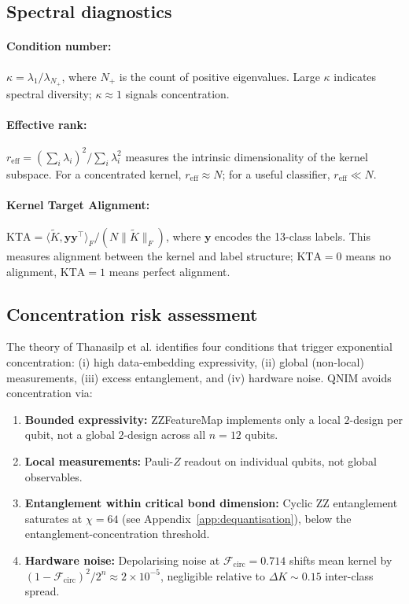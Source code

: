 \documentclass[11pt,a4paper, english]{book}
\theoremstyle{plain}
\theoremstyle{definition}
\numberwithin{equation}{chapter}
\numberwithin{figure}{chapter}
\numberwithin{table}{chapter}
\begin{document}
\subsection{Spectral diagnostics}

\paragraph{Condition number:} $\kappa = \lambda_1 / \lambda_{N_+}$, where
$N_+$ is the count of positive eigenvalues. Large $\kappa$ indicates spectral
diversity; $\kappa \approx 1$ signals concentration.

\paragraph{Effective rank:} $r_\mathrm{eff} = (\sum_i \lambda_i)^2 / \sum_i \lambda_i^2$
measures the intrinsic dimensionality of the kernel subspace. For a concentrated
kernel, $r_\mathrm{eff} \approx N$; for a useful classifier, $r_\mathrm{eff} \ll N$.

\paragraph{Kernel Target Alignment:} $\mathrm{KTA} = \langle\tilde{K}, \mathbf{y}\mathbf{y}^\top\rangle_F / (N \|\tilde{K}\|_F)$,
where $\mathbf{y}$ encodes the 13-class labels. This measures alignment between
the kernel and label structure; $\mathrm{KTA} = 0$ means no alignment,
$\mathrm{KTA} = 1$ means perfect alignment.

\subsection{Concentration risk assessment}

The theory of Thanasilp et al. \cite{Thanasilp_2024_conc} identifies four
conditions that trigger exponential concentration: (i) high data-embedding
expressivity, (ii) global (non-local) measurements, (iii) excess entanglement,
and (iv) hardware noise. QNIM avoids concentration via:
\begin{enumerate}
  \item \textbf{Bounded expressivity:} ZZFeatureMap implements only a local
        $2$-design per qubit, not a global $2$-design across all $n = 12$ qubits.
  \item \textbf{Local measurements:} Pauli-$Z$ readout on individual qubits,
        not global observables.
  \item \textbf{Entanglement within critical bond dimension:} Cyclic ZZ
        entanglement saturates at $\chi = 64$ (see Appendix~\ref{app:dequantisation}),
        below the entanglement-concentration threshold.
  \item \textbf{Hardware noise:} Depolarising noise at $\mathcal{F}_\mathrm{circ} = 0.714$
        shifts mean kernel by $(1-\mathcal{F}_\mathrm{circ})^2 / 2^n \approx 2 \times 10^{-5}$,
        negligible relative to $\Delta K \sim 0.15$ inter-class spread.
\end{enumerate}
\end{document}
